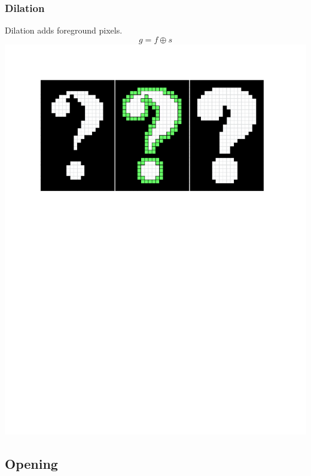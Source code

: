 \documentclass{beamer}
\begin{document}
\begin{frame}
\frametitle{Dilation}
\begin{center}
Dilation adds foreground pixels.
\begin{equation*}
g = f \oplus s
\end{equation*}
\includegraphics[width=1\textwidth,trim={0 0 0 0.5in},clip]{dilation}
\end{center}
\end{frame}

\subsection[Opening]{Opening}
\end{document}
